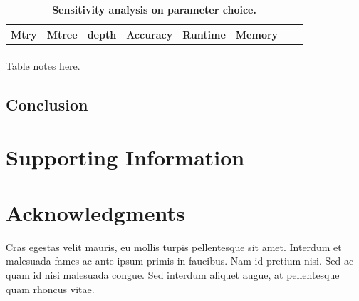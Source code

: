 \documentclass[10pt,a4paper]{article}  %
\begin{document}
\begin{table}[!ht]
\caption{
{\bf Sensitivity analysis on parameter choice.}}
\begin{tabular}{|l|l|l|l|l|l|l|l|}
\hline
\bf{Mtry}  & \bf{Mtree} & \bf{depth} & \bf{Accuracy} & \bf{Runtime} & \bf{Memory} \\
\hline
&&&&&\\ \hline
\end{tabular}
\begin{flushleft} 
  Table notes here.
\end{flushleft}
\label{table2}
\end{table}








\subsection{Conclusion}




\section{Supporting Information}



\section*{Acknowledgments}
Cras egestas velit mauris, eu mollis turpis pellentesque sit amet. Interdum et malesuada fames ac ante ipsum primis in faucibus. Nam id pretium nisi. Sed ac quam id nisi malesuada congue. Sed interdum aliquet augue, at pellentesque quam rhoncus vitae.
\end{document}
